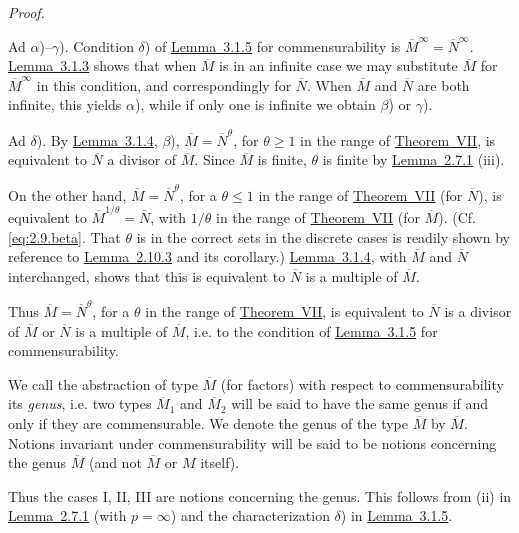 \documentclass[b5paper,twoside]{article}
\newcommand{\thmref}[2]{\hyperref[#1]{\mbox{Theorem~#2}}}
\newcommand{\lemref}[2]{\hyperref[#1]{\mbox{Lemma~#2}}}
\theoremstyle{mvnplain}
\renewenvironment{proof}[1][Proof]{%
  \par\addvspace{0.35\baselineskip}%
  \noindent\textit{#1.}\ \normalfont\ignorespaces
}{%
  \par\addvspace{0.35\baselineskip}%
}
\newcommand{\M}{\mathbf M}
\newcommand{\N}{\mathbf N}
\def\M{M}%
\def\N{N}%
\def\widetilde#1{#1}%
\begin{document}
\begin{proof}
Ad \(\alpha\))--\(\gamma\)). Condition \(\delta\)) of
\lemref{lem:3.1.5}{3.1.5} for commensurability is
\(\overline{\M}^{\infty}=\overline{\N}^{\infty}\).
\lemref{lem:3.1.3}{3.1.3} shows that when \(\overline{\M}\) is in an infinite
case we may substitute \(\overline{\M}\) for \(\overline{\M}^{\infty}\) in
this condition, and correspondingly for \(\overline{\N}\). When
\(\overline{\M}\) and \(\overline{\N}\) are both infinite, this yields
\(\alpha\)), while if only one is infinite we obtain \(\beta\)) or
\(\gamma\)).

Ad \(\delta\)). By \lemref{lem:3.1.4}{3.1.4}, \(\beta\)),
\(\overline{\M}=\overline{\N}^{\theta}\), for \(\theta\geq1\) in the range
of \thmref{thm:VII}{VII}, is equivalent to \(\overline{\N}\) a divisor of
\(\overline{\M}\). Since \(\overline{\M}\) is finite, \(\theta\) is finite
by \lemref{lem:2.7.1}{2.7.1} (iii).

On the other hand, \(\overline{\M}=\overline{\N}^{\theta}\), for a
\(\theta\leq1\) in the range of \thmref{thm:VII}{VII} (for
\(\overline{\N}\)), is equivalent to
\(\overline{\M}^{1/\theta}=\overline{\N}\), with \(1/\theta\) in the range
of \thmref{thm:VII}{VII} (for \(\overline{\M}\)). (Cf.
\eqref{eq:2.9.beta}. That \(\theta\) is in the correct sets in the discrete
cases is readily shown by reference to \lemref{lem:2.10.3}{2.10.3} and its
corollary.) \lemref{lem:3.1.4}{3.1.4}, with \(\overline{\M}\) and
\(\overline{\N}\) interchanged, shows that this is equivalent to
\(\overline{\N}\) is a multiple of \(\overline{\M}\).

Thus \(\overline{\M}=\overline{\N}^{\theta}\), for a \(\theta\) in the range
of \thmref{thm:VII}{VII}, is equivalent to \(\overline{\N}\) is a divisor of
\(\overline{\M}\) or \(\overline{\N}\) is a multiple of
\(\overline{\M}\), i.e. to the condition of \lemref{lem:3.1.5}{3.1.5} for
commensurability.
\end{proof}

We call the abstraction of type \(\overline{\M}\) (for factors) with respect
to commensurability its \emph{genus}, i.e. two types
\(\overline{\M}_1\) and \(\overline{\M}_2\) will be said to have the same
genus if and only if they are commensurable. We denote the genus of the type
\(\overline{\M}\) by \(\widetilde{\overline{\M}}\). Notions invariant under
commensurability will be said to be notions concerning the genus
\(\widetilde{\overline{\M}}\) (and not \(\overline{\M}\) or \(\M\) itself).

Thus the cases I, II, III are notions concerning the genus. This follows from
(ii) in \lemref{lem:2.7.1}{2.7.1} (with \(p=\infty\)) and the
characterization \(\delta\)) in \lemref{lem:3.1.5}{3.1.5}.
\end{document}

